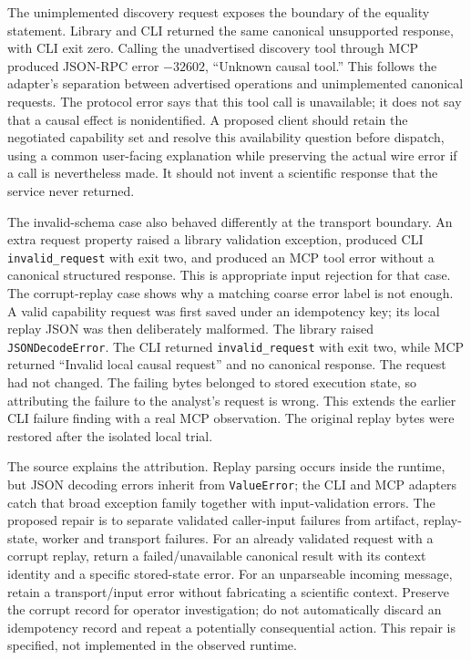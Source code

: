 The unimplemented discovery request exposes the boundary of the equality
statement. Library and CLI returned the same canonical unsupported response,
with CLI exit zero. Calling the unadvertised discovery tool through MCP
produced JSON-RPC error $-32602$, ``Unknown causal tool.'' This follows the
adapter's separation between advertised operations and unimplemented canonical
requests. The protocol error says that this tool call is unavailable; it does
not say that a causal effect is nonidentified. A proposed client should retain
the negotiated capability set and resolve this availability question before
dispatch, using a common user-facing explanation while preserving the actual
wire error if a call is nevertheless made. It should not invent a scientific
response that the service never returned.
\citep{exec16_parity_observed,v12_mcp_legacy_tools,exec16_parity_design}

The invalid-schema case also behaved differently at the transport boundary.
An extra request property raised a library validation exception, produced
CLI \texttt{invalid\_request} with exit two, and produced an MCP tool error
without a canonical structured response. This is appropriate input rejection
for that case. The corrupt-replay case shows why a matching coarse error label
is not enough. A valid capability request was first saved under an idempotency
key; its local replay JSON was then deliberately malformed. The library raised
\texttt{JSONDecodeError}. The CLI returned \texttt{invalid\_request} with
exit two, while MCP returned ``Invalid local causal request'' and no canonical
response. The request had not changed. The failing bytes belonged to stored
execution state, so attributing the failure to the analyst's request is wrong.
This extends the earlier CLI failure finding with a real MCP observation.
The original replay bytes were restored after the isolated local trial.
\citep{exec16_parity_observed}

The source explains the attribution. Replay parsing occurs inside the runtime,
but JSON decoding errors inherit from \texttt{ValueError}; the CLI and MCP
adapters catch that broad exception family together with input-validation
errors. The proposed repair is to separate validated caller-input failures
from artifact, replay-state, worker and transport failures. For an already
validated request with a corrupt replay, return a failed/unavailable canonical
result with its context identity and a specific stored-state error. For an
unparseable incoming message, retain a transport/input error without fabricating
a scientific context. Preserve the corrupt record for operator investigation;
do not automatically discard an idempotency record and repeat a potentially
consequential action. This repair is specified, not implemented in the observed
runtime. \citep{exec16_parity_observed,exec16_parity_design}


